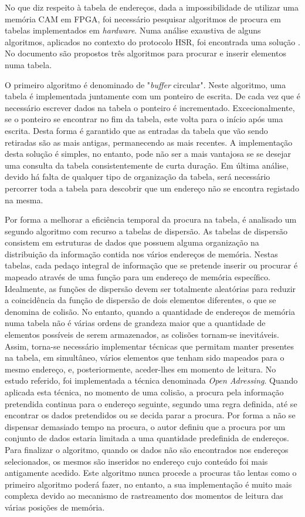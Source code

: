 No que diz respeito à tabela de endereços, dada a impossibilidade de utilizar uma memória CAM em FPGA, foi necessário pesquisar algoritmos de procura em tabelas implementados em \textit{hardware}. Numa análise exaustiva de alguns algoritmos, aplicados no contexto do protocolo HSR, foi encontrada uma solução \cite{HSR}. No documento são propostos três algoritmos para procurar e inserir elementos numa tabela.\par 
O primeiro algoritmo é denominado de "\textit{buffer} circular". Neste algoritmo, uma tabela é implementada juntamente com um ponteiro de escrita. De cada vez que é necessário escrever dados na tabela o ponteiro é incrementado. Excecionalmente, se o ponteiro se encontrar no fim da tabela, este volta para o início após uma escrita. Desta forma é garantido que as entradas da tabela que vão sendo retiradas são as mais antigas, permanecendo as mais recentes. A implementação desta solução é simples, no entanto, pode não ser a mais vantajosa se se desejar uma consulta da tabela consistentemente de curta duração. Em última análise, devido há falta de qualquer tipo de organização da tabela, será necessário percorrer toda a tabela para descobrir que um endereço não se encontra registado na mesma.\par 
Por forma a melhorar a eficiência temporal da procura na tabela, é analisado um segundo algoritmo com recurso a tabelas de dispersão. As tabelas de dispersão consistem em estruturas de dados que possuem alguma organização na distribuição da informação contida nos vários endereços de memória. Nestas tabelas, cada pedaço integral de informação que se pretende inserir ou procurar é mapeado através de uma função para um endereço de memória específico. Idealmente, as funções de dispersão devem ser totalmente aleatórias para reduzir a coincidência da função de dispersão de dois elementos diferentes, o que se denomina de colisão. No entanto, quando a quantidade de endereços de memória numa tabela não é várias ordens de grandeza maior que a quantidade de elementos possíveis de serem armazenados, as colisões tornam-se inevitáveis. Assim, torna-se necessário implementar técnicas que permitam manter presentes na tabela, em simultâneo, vários elementos que tenham sido mapeados para o mesmo endereço, e, posteriormente, aceder-lhes em momento de leitura. No estudo referido, foi implementada a técnica denominada \textit{Open Adressing}. Quando aplicada esta técnica, no momento de uma colisão, a procura pela informação pretendida continua para o endereço seguinte, segundo uma regra definida, até se encontrar os dados pretendidos ou se decida parar a procura. Por forma a não se dispensar demasiado tempo na procura, o autor definiu que a procura por um conjunto de dados estaria limitada a uma quantidade predefinida de endereços. Para finalizar o algoritmo, quando os dados não são encontrados nos endereços selecionados, os mesmos são inseridos no endereço cujo conteúdo foi mais antigamente acedido. Este algoritmo nunca procede a procuras tão lentas como o primeiro algoritmo poderá fazer, no entanto, a sua implementação é muito mais complexa devido ao mecanismo de rastreamento dos momentos de leitura das várias posições de memória.\par 
